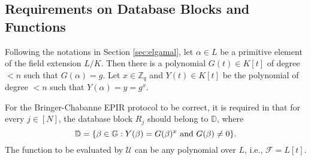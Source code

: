 \documentclass[JMC]{degruyter-journal}
\begin{document}
\subsection{Requirements on Database Blocks and Functions}\label{sec:input_domain}

Following the notations  in Section \ref{sec:elgamal}, let
$\alpha\in L$ be a primitive element of the field extension $L/K$.
Then there is a  polynomial $G(t)\in K[t]$ of degree $<n$ such that
 $G(\alpha)=g$.
Let $x\in \mathbb{Z}_q$ and  $Y(t)\in  K[t]$ be the polynomial of degree $<n$ such that
$Y(\alpha)=y=g^x$.

For the Bringer-Chabanne EPIR protocol   to be correct, it is
required
 in \cite{BC09} that
 for every $j\in[N]$, the database block $R_j$ should belong to  $\mathbb{D}$, where
$$\mathbb{D}=\{\beta\in \mathbb{G}: Y(\beta)=G(\beta)^x{\rm ~and~} G(\beta)\neq 0\}.$$
The function to be evaluated by $\mathcal{U}$ can be any polynomial
over $L$, i.e., $\mathcal{F}=L[t]$.
\end{document}
